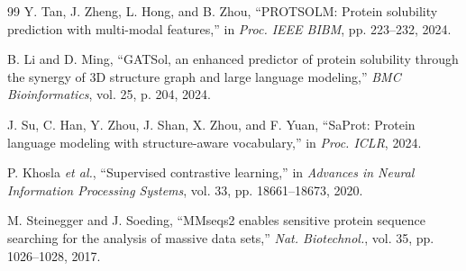 \documentclass[conference]{IEEEtran}
\begin{document}
\begin{thebibliography}{99}
Y. Tan, J. Zheng, L. Hong, and B. Zhou, ``PROTSOLM: Protein solubility prediction with multi-modal features,'' in \emph{Proc. IEEE BIBM}, pp. 223--232, 2024.

B. Li and D. Ming, ``GATSol, an enhanced predictor of protein solubility through the synergy of 3D structure graph and large language modeling,'' \emph{BMC Bioinformatics}, vol. 25, p. 204, 2024.

J. Su, C. Han, Y. Zhou, J. Shan, X. Zhou, and F. Yuan, ``SaProt: Protein language modeling with structure-aware vocabulary,'' in \emph{Proc. ICLR}, 2024.

P. Khosla \emph{et al.}, ``Supervised contrastive learning,'' in \emph{Advances in Neural Information Processing Systems}, vol. 33, pp. 18661--18673, 2020.

M. Steinegger and J. Soeding, ``MMseqs2 enables sensitive protein sequence searching for the analysis of massive data sets,'' \emph{Nat. Biotechnol.}, vol. 35, pp. 1026--1028, 2017.

\end{thebibliography}
\end{document}
